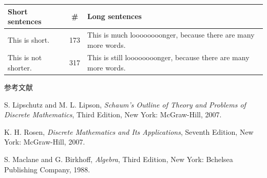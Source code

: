 
\begin{center}
	\begin{tabulary}{0.7\textwidth}{|L|C|L|}
		Short sentences      & \#  & Long sentences                                                 \\
		\hline
		This is short.       & 173 & This is much loooooooonger, because there are many more words.  \\
		This is not shorter. & 317 & This is still loooooooonger, because there are many more words. \\
	\end{tabulary}  
\end{center}

参考文献
%

\begin{thebibliography}{99}
	
	
	S. Lipschutz and M. L. Lipson, \textit{Schaum's Outline of Theory and Problems of Discrete Mathematics}, Third Edition, New York: McGraw-Hill, 2007.
	
	K. H. Rosen, \textit{Discrete Mathematics and Its Applications}, Seventh Edition, New York: McGraw-Hill, 2007.
	
	S. Maclane and G. Birkhoff, \textit{Algebra}, Third Edition, New York: Bchelsea Publishing Company, 1988.
\end{thebibliography}
